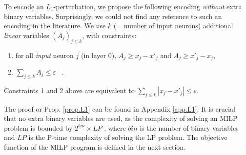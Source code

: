 \label{s.L1}

	To encode an $L_1$-perturbation, we propose the following encoding {\em without} extra binary variables. Surprisingly, we could not find any reference to such an encoding in the literature.
	We use $k$ (= number of input neurons) additional {\em linear} variables 
	$(A_j)_{j \leq k}$, with constraints:
	\begin{enumerate}
\item for all {\em input} neuron $j$ (in layer 0), 
	$A_j \geq x_j - x'_j $ and $A_j \geq x'_j - x_j$,

\item $\sum_{j\leq k} A_j \leq \varepsilon$ 
\quad \, .
	\end{enumerate}



\begin{proposition}
	\label{prop.L1}
 Constraints 1 and 2 above are equivalent to $\sum_{j\leq k} |x_j-x'_j| \leq \varepsilon$.
\end{proposition}


The proof or Prop. \ref{prop.L1} can be found in Appendix 
\ref{app.L1}. 
It is crucial that no extra binary variables are used, as the complexity of solving an MILP problem is bounded by $2^{bin} \times LP$ \cite{DivideAndSlide}, where $bin$ is the number of binary variables and $LP$ is the P-time complexity of solving the LP problem. The objective function of the MILP program is defined in the next section.